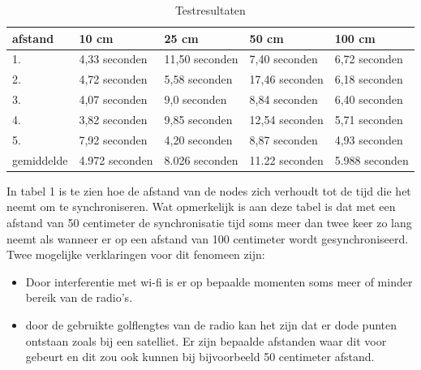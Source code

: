 \documentclass{article}
\begin{document}
    
\begin{table}[h]
	\centering\caption{Testresultaten}
	\label{tab: testresultaten}
    \begin{tabular}{ l | l | l | l |  l}
    \textbf{afstand } & \textbf{10 cm } & \textbf{25 cm} & \textbf{50 cm} & \textbf{100 cm} \\ \hline\hline
   1. & 4,33 seconden & 11,50 seconden& 7,40 seconden& 6,72 seconden\\ \hline
    2. & 4,72 seconden & 5,58 seconden& 17,46 seconden& 6,18 seconden\\ \hline
    3. & 4,07 seconden & 9,0 seconden& 8,84 seconden& 6,40 seconden\\ \hline
    4. & 3,82 seconden & 9,85 seconden& 12,54 seconden& 5,71 seconden\\ \hline
    5. & 7,92 seconden & 4,20 seconden& 8,87 seconden& 4,93 seconden\\ \hline \hline
   gemiddelde & 4.972 seconden & 8.026 seconden& 11.22 seconden& 5.988 seconden
    \end{tabular}
\end{table}

In tabel 1 is te zien hoe de afstand van de nodes zich verhoudt tot de tijd die het neemt om te synchroniseren. Wat opmerkelijk is aan deze tabel is dat met een afstand van 50 centimeter de synchronisatie tijd soms meer dan twee keer zo lang neemt als wanneer er op een afstand van 100 centimeter wordt gesynchroniseerd. Twee mogelijke verklaringen voor dit fenomeen zijn:
\begin{itemize}
	\item Door interferentie met wi-fi is er op bepaalde momenten soms meer of minder bereik van de radio's.
	\item door de gebruikte golflengtes van de radio kan het zijn dat er dode punten ontstaan zoals bij een satelliet. Er zijn bepaalde afstanden waar dit voor gebeurt en dit zou ook kunnen bij bijvoorbeeld 50 centimeter afstand. 
\end{itemize}
\newpage
\end{document}
